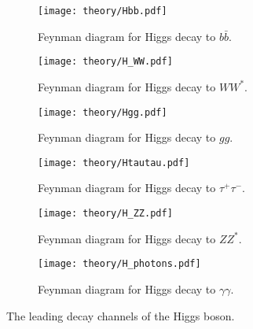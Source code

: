 \begin{figure}[htbp]
 \centering
 \begin{subfigure}[t]{0.48\textwidth}
  \centering
  \texttt{[image: theory/Hbb.pdf]}
  \caption[Feynman diagram for Higgs decay to $b\bar{b}$.]{%
   Feynman diagram for Higgs decay to $b\bar{b}$.}
  \label{fig:H_to_bb}
 \end{subfigure}
 \quad
 \begin{subfigure}[t]{0.48\textwidth}
  \centering
  \texttt{[image: theory/H\_WW.pdf]}
  \caption[Feynman diagram for Higgs decay to $WW^{*}$.]{%
   Feynman diagram for Higgs decay to $WW^{*}$.}
  \label{fig:H_to_WW}
 \end{subfigure}

 \begin{subfigure}[t]{0.48\textwidth}
  \centering
  \texttt{[image: theory/Hgg.pdf]}
  \caption[Feynman diagram for Higgs decay to $gg$.]{%
   Feynman diagram for Higgs decay to $gg$.}
  \label{fig:H_to_gg}
 \end{subfigure}
 \quad
 \begin{subfigure}[t]{0.48\textwidth}
  \centering
  \texttt{[image: theory/Htautau.pdf]}
  \caption[Feynman diagram for Higgs decay to $\tau^{+}\tau^{-}$.]{%
   Feynman diagram for Higgs decay to $\tau^{+}\tau^{-}$.}
  \label{fig:H_to_tautau}
 \end{subfigure}

 \begin{subfigure}[t]{0.48\textwidth}
  \centering
  \texttt{[image: theory/H\_ZZ.pdf]}
  \caption[Feynman diagram for Higgs decay to $ZZ^{*}$.]{%
   Feynman diagram for Higgs decay to $ZZ^{*}$.}
  \label{fig:H_to_ZZ}
 \end{subfigure}
 \quad
 \begin{subfigure}[t]{0.48\textwidth}
  \centering
  \texttt{[image: theory/H\_photons.pdf]}
  \caption[Feynman diagram for Higgs decay to $\gamma\gamma$.]{%
   Feynman diagram for Higgs decay to $\gamma\gamma$.}
  \label{fig:H_to_photons}
 \end{subfigure}
 \caption[The leading decay channels of the Higgs boson.]{%
  The leading decay channels of the Higgs boson.}
 \label{fig:Higgs_decay_channels}
\end{figure}

